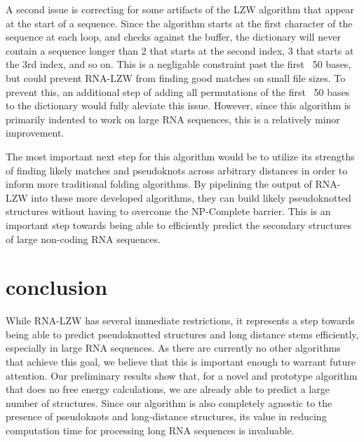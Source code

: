 \documentclass[sigconf]{acmart}
\begin{document}
A second issue is correcting for some artifacts of the LZW algorithm that appear at the start of a sequence. Since the algorithm starts at the first character of the sequence at each loop, and checks against the buffer, the dictionary will never contain a sequence longer than 2 that starts at the second index, 3 that starts at the 3rd index, and so on. This is a negligable constraint past the first ~50 bases, but could prevent RNA-LZW from finding good matches on small file sizes. To prevent this, an additional step of adding all permutations of the first ~50 bases to the dictionary would fully aleviate this issue. However, since this algorithm is primarily indented to work on large RNA sequences, this is a relatively minor improvement.

The most important next step for this algorithm would be to utilize its strengths of finding likely matches and pseudoknots across arbitrary distances in order to inform more traditional folding algorithms. By pipelining the output of RNA-LZW into these more developed algorithms, they can build likely pseudoknotted structures without having to overcome the NP-Complete barrier. This is an important step towards being able to efficiently predict the secondary structures of large non-coding RNA sequences. 



\section{conclusion}

While RNA-LZW has several immediate restrictions, it represents a step towards being able to predict pseudoknotted structures and long distance stems efficiently, especially in large RNA sequences. As there are currently no other algorithms that achieve this goal, we believe that this is important enough to warrant future attention. Our preliminary results show that, for a novel and prototype algorithm that does no free energy calculations, we are already able to predict a large number of structures. Since our algorithm is also completely agnostic to the presence of pseudoknots and long-distance structures, its value in reducing computation time for processing long RNA sequences is invaluable. 
\end{document}
